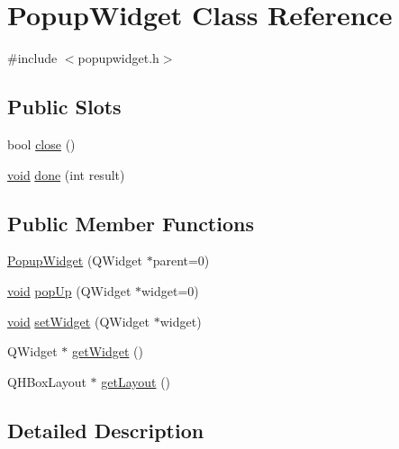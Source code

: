 \hypertarget{class_popup_widget}{\section{\-Popup\-Widget \-Class \-Reference}
\label{class_popup_widget}
}


{\ttfamily \#include $<$popupwidget.\-h$>$}

\subsection*{\-Public \-Slots}
\begin{DoxyCompactItemize}
\item 
bool \hyperlink{class_popup_widget_a9c5e3e0474a1a827babe0c8169cb429f}{close} ()
\item 
\hyperlink{group___u_a_v_objects_plugin_ga444cf2ff3f0ecbe028adce838d373f5c}{void} \hyperlink{class_popup_widget_a36603e041ee92cc5440f1f9147b5ed2c}{done} (int result)
\end{DoxyCompactItemize}
\subsection*{\-Public \-Member \-Functions}
\begin{DoxyCompactItemize}
\item 
\hyperlink{class_popup_widget_a65bffb57db36284b740a658485c68798}{\-Popup\-Widget} (\-Q\-Widget $\ast$parent=0)
\item 
\hyperlink{group___u_a_v_objects_plugin_ga444cf2ff3f0ecbe028adce838d373f5c}{void} \hyperlink{class_popup_widget_a7fa5f95babcb7743b3dd2e5acee81360}{pop\-Up} (\-Q\-Widget $\ast$widget=0)
\item 
\hyperlink{group___u_a_v_objects_plugin_ga444cf2ff3f0ecbe028adce838d373f5c}{void} \hyperlink{class_popup_widget_a173835e7564514126a61eeedd7c202fc}{set\-Widget} (\-Q\-Widget $\ast$widget)
\item 
\-Q\-Widget $\ast$ \hyperlink{class_popup_widget_a4ea4121adae94efb898dcd8a37cc5db6}{get\-Widget} ()
\item 
\-Q\-H\-Box\-Layout $\ast$ \hyperlink{class_popup_widget_a66c5a451e2226eeb838c18b8b394751b}{get\-Layout} ()
\end{DoxyCompactItemize}


\subsection{\-Detailed \-Description}


